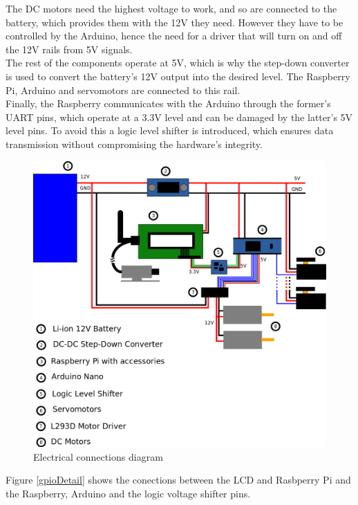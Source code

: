 The DC motors need the highest voltage to work, and so are connected to the battery, which provides them with the 12V they need. However they have to be controlled by the Arduino, hence the need for a driver that will turn on and off the 12V rails from 5V signals.\\

The rest of the components operate at 5V, which is why the step-down converter is used to convert the battery's 12V output into the desired level. The Raspberry Pi, Arduino and servomotors are connected to this rail.\\

Finally, the Raspberry communicates with the Arduino through the former's UART pins, which operate at a 3.3V level and can be damaged by the latter's 5V level pins. To avoid this a logic level shifter is introduced, which ensures data transmission without compromising the hardware's integrity.\\

	\begin{figure}[H]
			\centering
			\includegraphics[width=15cm, angle=0]{images/Diagrams/electrical.png}
			\caption{Electrical connections diagram }
			\label{electricDiagram}
	\end{figure}
	\bigskip
	
\bigskip
Figure \ref{gpioDetail} shows the conections between the LCD and Rasbperry Pi and the Raspberry, Arduino and the logic voltage shifter pins.

